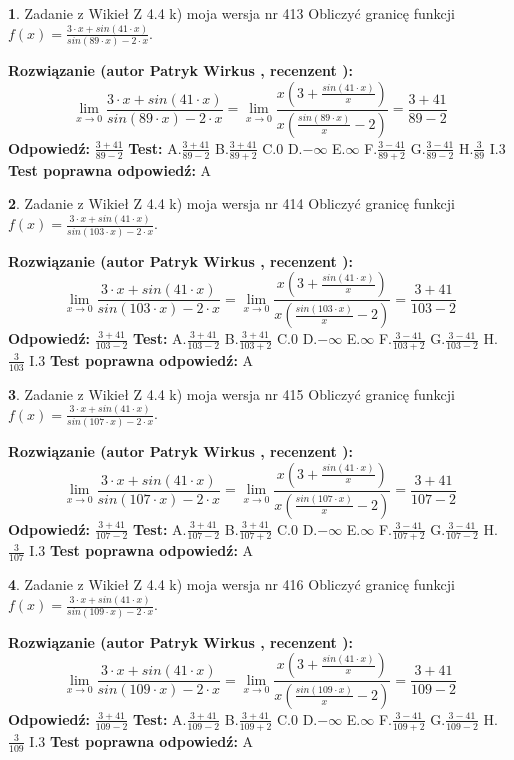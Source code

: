 \documentclass[12pt, a4paper]{article}
\theoremstyle{definition} %
\newtheorem{zad}{}
\newcommand{\zadStart}[1]{\begin{zad}#1\newline}
\newcommand{\zadStop}{\end{zad}}
\newcommand{\rozwStart}[2]{\noindent \textbf{Rozwiązanie (autor #1 , recenzent #2): }\newline}
\newcommand{\rozwStop}{\newline}
\newcommand{\odpStart}{\noindent \textbf{Odpowiedź:}\newline}
\newcommand{\odpStop}{\newline}
\newcommand{\testStart}{\noindent \textbf{Test:}\newline}
\newcommand{\testStop}{\newline}
\newcommand{\kluczStart}{\noindent \textbf{Test poprawna odpowiedź:}\newline}
\newcommand{\kluczStop}{\newline}
\begin{document}
\zadStart{Zadanie z Wikieł Z 4.4 k) moja wersja nr 413}
Obliczyć granicę funkcji $f(x)=\frac{3\cdot x +sin(41\cdot x)}{sin(89\cdot x) -2\cdot x}$.
\zadStop
\rozwStart{Patryk Wirkus}{}
$$\lim\limits_{x\to 0}\frac{3\cdot x +sin(41\cdot x)}{sin(89\cdot x) -2\cdot x}
=\lim\limits_{x\to 0}\frac{x(3+\frac{sin(41\cdot x)}{x})}{x(\frac{sin(89\cdot x)}{x}-2)}
=\frac{3+41}{89-2}$$
\rozwStop
\odpStart
$\frac{3+41}{89-2}$
\odpStop
\testStart
A.$\frac{3+41}{89-2}$
B.$\frac{3+41}{89+2}$
C.$0$
D.$-\infty$
E.$\infty$
F.$\frac{3-41}{89+2}$
G.$\frac{3-41}{89-2}$
H.$\frac{3}{89}$
I.$3$
\testStop
\kluczStart
A
\kluczStop



\zadStart{Zadanie z Wikieł Z 4.4 k) moja wersja nr 414}
Obliczyć granicę funkcji $f(x)=\frac{3\cdot x +sin(41\cdot x)}{sin(103\cdot x) -2\cdot x}$.
\zadStop
\rozwStart{Patryk Wirkus}{}
$$\lim\limits_{x\to 0}\frac{3\cdot x +sin(41\cdot x)}{sin(103\cdot x) -2\cdot x}
=\lim\limits_{x\to 0}\frac{x(3+\frac{sin(41\cdot x)}{x})}{x(\frac{sin(103\cdot x)}{x}-2)}
=\frac{3+41}{103-2}$$
\rozwStop
\odpStart
$\frac{3+41}{103-2}$
\odpStop
\testStart
A.$\frac{3+41}{103-2}$
B.$\frac{3+41}{103+2}$
C.$0$
D.$-\infty$
E.$\infty$
F.$\frac{3-41}{103+2}$
G.$\frac{3-41}{103-2}$
H.$\frac{3}{103}$
I.$3$
\testStop
\kluczStart
A
\kluczStop



\zadStart{Zadanie z Wikieł Z 4.4 k) moja wersja nr 415}
Obliczyć granicę funkcji $f(x)=\frac{3\cdot x +sin(41\cdot x)}{sin(107\cdot x) -2\cdot x}$.
\zadStop
\rozwStart{Patryk Wirkus}{}
$$\lim\limits_{x\to 0}\frac{3\cdot x +sin(41\cdot x)}{sin(107\cdot x) -2\cdot x}
=\lim\limits_{x\to 0}\frac{x(3+\frac{sin(41\cdot x)}{x})}{x(\frac{sin(107\cdot x)}{x}-2)}
=\frac{3+41}{107-2}$$
\rozwStop
\odpStart
$\frac{3+41}{107-2}$
\odpStop
\testStart
A.$\frac{3+41}{107-2}$
B.$\frac{3+41}{107+2}$
C.$0$
D.$-\infty$
E.$\infty$
F.$\frac{3-41}{107+2}$
G.$\frac{3-41}{107-2}$
H.$\frac{3}{107}$
I.$3$
\testStop
\kluczStart
A
\kluczStop



\zadStart{Zadanie z Wikieł Z 4.4 k) moja wersja nr 416}
Obliczyć granicę funkcji $f(x)=\frac{3\cdot x +sin(41\cdot x)}{sin(109\cdot x) -2\cdot x}$.
\zadStop
\rozwStart{Patryk Wirkus}{}
$$\lim\limits_{x\to 0}\frac{3\cdot x +sin(41\cdot x)}{sin(109\cdot x) -2\cdot x}
=\lim\limits_{x\to 0}\frac{x(3+\frac{sin(41\cdot x)}{x})}{x(\frac{sin(109\cdot x)}{x}-2)}
=\frac{3+41}{109-2}$$
\rozwStop
\odpStart
$\frac{3+41}{109-2}$
\odpStop
\testStart
A.$\frac{3+41}{109-2}$
B.$\frac{3+41}{109+2}$
C.$0$
D.$-\infty$
E.$\infty$
F.$\frac{3-41}{109+2}$
G.$\frac{3-41}{109-2}$
H.$\frac{3}{109}$
I.$3$
\testStop
\kluczStart
A
\kluczStop
\end{document}
